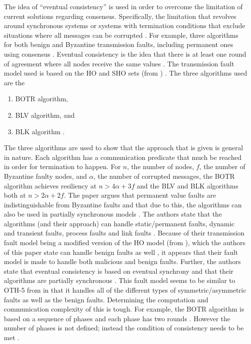 \documentclass[twoside, conference]{IEEEtran}
\begin{document}
The idea of  ``eventual consistency'' is used in order to overcome the limitation of current solutions regarding consensus.  Specifically, the limitation that revolves around synchronous systems or systems with termination conditions that exclude situations where all messages can be corrupted \cite{Milosevic2014}.  For example, three algorithms for both benign and Byzantine transmission faults, including permanent ones using consensus \cite{Milosevic2014}.  Eventual consistency is the idea that there is at least one round of agreement where all nodes receive the same values \cite{Milosevic2014}.  The transmission fault model used is based on the HO and SHO sets (from \cite{Biely2007}) \cite{Milosevic2014}.  The three algorithms used are the 
\begin{enumerate}
	\item BOTR algorithm,
	\item BLV algorithm, and
	\item BLK algorithm \cite{Milosevic2014}.
\end{enumerate}
The three algorithms are used to show that the approach that is given is general in nature.  Each algorithm has a communication predicate that much be reached in order for termination to happen.  For $n$, the number of nodes, $f$, the number of Byzantine faulty nodes, and $\alpha$, the number of corrupted messages, the BOTR algorithm achieves resiliency at $n > 4\alpha + 3f$ and the BLV and BLK algorithms both at $n > 2\alpha + 2f$\cite{Milosevic2014}.  The paper argues that permanent value faults are indistinguishable from Byzantine faults and that due to this, the algorithms can also be used in partially synchronous models \cite{Milosevic2014}.  The authors state that the algorithms (and their approach) can handle static/permanent faults, dynamic and transient faults, process faults and link faults \cite{Milosevic2014}.  Because of their transmission fault model being a modified version of the HO model (from \cite{Biely2007}), which the authors of this paper state can handle benign faults as well \cite{Milosevic2014}, it appears that their fault model is made to handle both malicious and benign faults.  Further, the authors state that eventual consistency is based on eventual synchrony \cite{Milosevic2014} and that their algorithms are partially synchronous \cite{Milosevic2014}.  This fault model seems to be similar to OTH-5 from \cite{Azadmanesh2000} in that it handles all of the different types of symmetric/asymmetric faults as well as the benign faults.  Determining the computation and communication complexity of this is tough.  For example, the BOTR algorithm is based on a sequence of phases and each phase has two rounds \cite{Milosevic2014}.  However the number of phases is not defined; instead the condition of consistency needs to be met \cite{Milosevic2014}.
\end{document}
